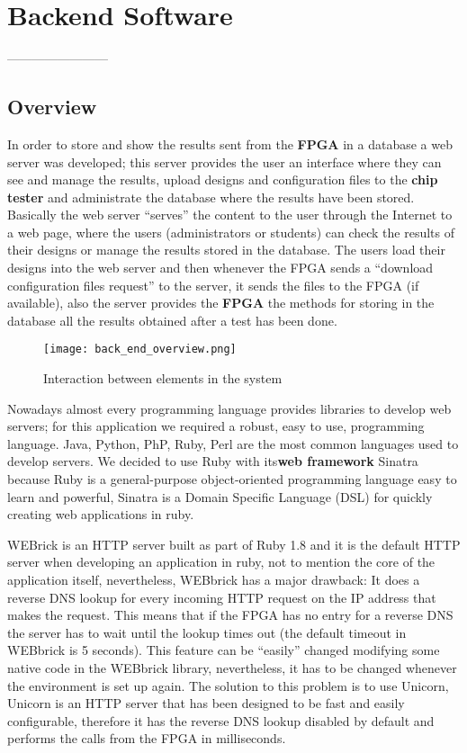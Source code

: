 \chapter{Backend Software}
------------------------

\section{Overview}
  In order to store and show the results sent from the {\bf FPGA} in a database a web server was developed; this server provides the user an interface where they can
see and manage the results, upload designs and configuration files to the {\bf chip tester} and administrate the database where the results have been stored. Basically
the web server ``serves'' the content to the user through the Internet to a web page, where the users (administrators or students) can check the results of their designs
or manage the results stored in the database. The users load their designs into the web server and then whenever the FPGA sends a ``download configuration files request''
to the server, it sends the files to the FPGA (if available), also the server provides the {\bf FPGA} the methods for storing in the database all the results obtained after
a test has been done.

\begin{figure}[htb]
\centering
\texttt{[image: back\_end\_overview.png]}
\caption{Interaction between elements in the system}
\label{fig:back_end_structure}
\end{figure}


 Nowadays almost every programming language provides libraries to develop web servers; for this application we required a robust, easy to use, programming language. Java, Python, PhP, Ruby,
Perl are the most common languages used to develop servers. We decided to use Ruby with its{\bf web framework} Sinatra because Ruby is a general-purpose object-oriented programming language easy to learn
and powerful, Sinatra is a Domain Specific Language (DSL) for quickly creating web applications in ruby.

WEBrick is an HTTP server built as part of Ruby 1.8 and it is the default HTTP server when
developing an application in ruby, not to mention the core of the application itself, nevertheless, WEBbrick has a major drawback: It does a reverse DNS lookup for every incoming HTTP request on
the IP address that makes the request. This means that if the FPGA has no entry for a reverse DNS the server has to wait until the lookup times out (the default timeout in WEBbrick is 5 seconds).
This feature can be ``easily'' changed modifying some native code in the WEBbrick library, nevertheless, it has to be changed whenever the environment is set up again. The solution to this problem is to
use Unicorn, Unicorn is an HTTP server that has been designed to be fast and easily configurable, therefore it has the reverse DNS lookup disabled by default and performs the calls from the FPGA in milliseconds.

